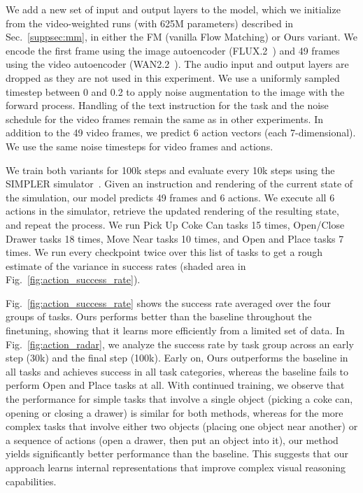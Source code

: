 \documentclass{article}
\theoremstyle{plain}
\theoremstyle{definition}
\theoremstyle{remark}
\begin{document}
We add a new set of input and output layers to the model, which we initialize from the video-weighted runs (with 625M parameters) described in Sec.~\ref{suppsec:mm}, in either the FM (vanilla Flow Matching) or Ours variant. We encode the first frame using the image autoencoder (FLUX.2~\citep{bfl2025representation}) and 49 frames using the video autoencoder (WAN2.2~\citep{wan2025}). The audio input and output layers are dropped as they are not used in this experiment. We use a uniformly sampled timestep between 0 and 0.2 to apply noise augmentation to the image with the forward process. Handling of the text instruction for the task and the noise schedule for the video frames remain the same as in other experiments. In addition to the 49 video frames, we predict 6 action vectors (each 7-dimensional). We use the same noise timesteps for video frames and actions.

We train both variants for 100k steps and evaluate every 10k steps using the SIMPLER simulator~\citep{simpler}. Given an instruction and rendering of the current state of the simulation, our model predicts 49 frames and 6 actions. We execute all 6 actions in the simulator, retrieve the updated rendering of the resulting state, and repeat the process. We run Pick Up Coke Can tasks 15 times, Open/Close Drawer tasks 18 times, Move Near tasks 10 times, and Open and Place tasks 7 times. We run every checkpoint twice over this list of tasks to get a rough estimate of the variance in success rates (shaded area in Fig.~\ref{fig:action_success_rate}).

Fig.~\ref{fig:action_success_rate} shows the success rate averaged over the four groups of tasks. Ours performs better than the baseline throughout the finetuning, showing that it learns more efficiently from a limited set of data. In Fig.~\ref{fig:action_radar}, we analyze the success rate by task group across an early step (30k) and the final step (100k). Early on, Ours outperforms the baseline in all tasks and achieves success in all task categories, whereas the baseline fails to perform Open and Place tasks at all. With continued training, we observe that the performance for simple tasks that involve a single object (picking a coke can, opening or closing a drawer) is similar for both methods, whereas for the more complex tasks that involve either two objects (placing one object near another) or a sequence of actions (open a drawer, then put an object into it), our method yields significantly better performance than the baseline. This suggests that our approach learns internal representations that improve complex visual reasoning capabilities.
\end{document}
